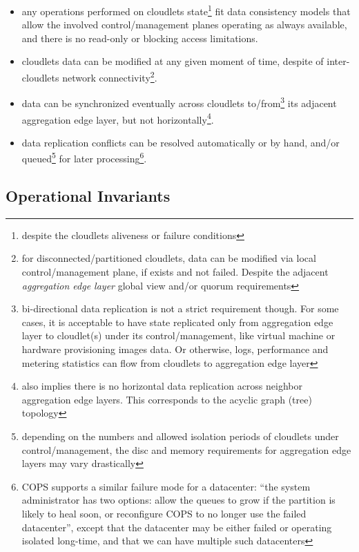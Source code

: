 \documentclass[conference]{IEEEtran}
\begin{document}
\begin{itemize}
  \item any operations performed on cloudlets state\footnote{despite the
    cloudlets aliveness or failure conditions} fit data consistency models that
    allow the involved control/management planes operating as always available,
    and there is no read-only or blocking access limitations.
  \item cloudlets data can be modified at any given moment of time, despite of
    inter-cloudlets network connectivity\footnote{for disconnected/partitioned
    cloudlets, data can be modified via local control/management plane, if
    exists and not failed. Despite the adjacent \textit{aggregation edge
    layer}\cite{b3} global view and/or quorum requirements}.
  \item data can be synchronized eventually across cloudlets
    to/from\footnote{bi-directional data replication is not a strict
    requirement though. For some cases, it is acceptable to have state
    replicated only from aggregation edge layer to cloudlet(s) under its
    control/management, like virtual machine or hardware provisioning images
    data. Or otherwise, logs, performance and metering statistics can flow from
    cloudlets to aggregation edge layer} its adjacent aggregation edge layer,
    but not horizontally\footnote{also implies there is no horizontal data
    replication across neighbor aggregation edge layers. This corresponds to
    the acyclic graph (tree) topology}.
  \item data replication conflicts can be resolved automatically or by hand,
    and/or queued\footnote{depending on the numbers and allowed isolation
    periods of cloudlets under control/management, the disc and memory
    requirements for aggregation edge layers may vary drastically} for later
    processing\footnote{COPS\cite{b1} supports a similar failure mode for a
    datacenter: ``the system administrator has two options: allow the queues to
    grow if the partition is likely to heal soon, or reconfigure COPS to no
    longer use the failed datacenter'', except that the datacenter may be
    either failed or operating isolated long-time, and that we can have
    multiple such datacenters}.
\end{itemize}

\subsection{Operational Invariants}
\end{document}
